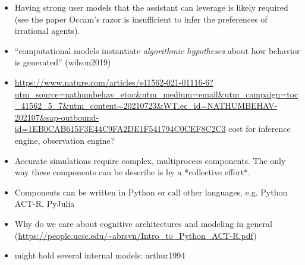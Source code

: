 \documentclass[12pt,a4paper]{article}
\begin{document}
\begin{itemize}
\item Having strong user models that the assistant can leverage is likely required (see the paper Occam's razor is insufficient to infer the preferences of irrational agents).
\item ``computational models instantiate \textit{algorithmic hypotheses} about how behavior is generated'' (wilson2019)
\item \url{https://www.nature.com/articles/s41562-021-01116-6?utm_source=nathumbehav_etoc&utm_medium=email&utm_campaign=toc_41562_5_7&utm_content=20210723&WT.ec_id=NATHUMBEHAV-202107&sap-outbound-id=1EB0CAB615F3E44C9FA2DE1F541794C0CEF8C2C3} cost for inference engine, observation engine?
\item Accurate simulations require complex, multiprocess components. The only way these components can be describe is by a *collective effort*.
\item Components can be written in Python or call other languages, e.g. Python ACT-R, PyJulia
\item Why do we care about cognitive architectures and modeling
in general (\url{https://people.ucsc.edu/~abrsvn/Intro_to_Python_ACT-R.pdf})
\item might hold several internal models: arthur1994
\end{itemize}
\end{document}

